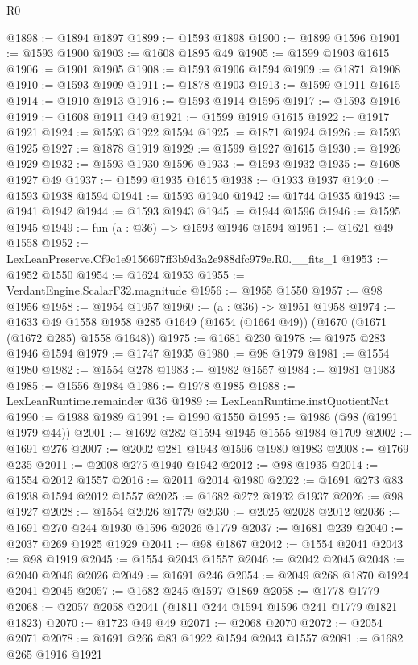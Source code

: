 \begin{lexlean}{R0}
\begin{coremodule}
@1898 := @1894 @1897
@1899 := @1593 @1898
@1900 := @1899 @1596
@1901 := @1593 @1900
@1903 := @1608 @1895 @49
@1905 := @1599 @1903 @1615
@1906 := @1901 @1905
@1908 := @1593 @1906 @1594
@1909 := @1871 @1908
@1910 := @1593 @1909
@1911 := @1878 @1903
@1913 := @1599 @1911 @1615
@1914 := @1910 @1913
@1916 := @1593 @1914 @1596
@1917 := @1593 @1916
@1919 := @1608 @1911 @49
@1921 := @1599 @1919 @1615
@1922 := @1917 @1921
@1924 := @1593 @1922 @1594
@1925 := @1871 @1924
@1926 := @1593 @1925
@1927 := @1878 @1919
@1929 := @1599 @1927 @1615
@1930 := @1926 @1929
@1932 := @1593 @1930 @1596
@1933 := @1593 @1932
@1935 := @1608 @1927 @49
@1937 := @1599 @1935 @1615
@1938 := @1933 @1937
@1940 := @1593 @1938 @1594
@1941 := @1593 @1940
@1942 := @1744 @1935
@1943 := @1941 @1942
@1944 := @1593 @1943
@1945 := @1944 @1596
@1946 := @1595 @1945
@1949 := fun (a : @36) => @1593 @1946 @1594
@1951 := @1621 @49 @1558
@1952 := LexLeanPreserve.Cf9c1e9156697ff3b9d3a2e988dfc979e.R0.__fits_1
@1953 := @1952 @1550
@1954 := @1624 @1953
@1955 := VerdantEngine.ScalarF32.magnitude
@1956 := @1955 @1550
@1957 := @98 @1956
@1958 := @1954 @1957
@1960 := (a : @36) -> @1951 @1958
@1974 := @1633
    @49
    @1558
    @1958
    @285
    @1649
    (@1654 (@1664 @49))
    (@1670 (@1671 (@1672 @285) @1558 @1648))
@1975 := @1681 @230
@1978 := @1975 @283 @1946 @1594
@1979 := @1747 @1935
@1980 := @98 @1979
@1981 := @1554 @1980
@1982 := @1554 @278
@1983 := @1982 @1557
@1984 := @1981 @1983
@1985 := @1556 @1984
@1986 := @1978 @1985
@1988 := LexLeanRuntime.remainder @36
@1989 := LexLeanRuntime.instQuotientNat
@1990 := @1988 @1989
@1991 := @1990 @1550
@1995 := @1986 (@98 (@1991 @1979 @44))
@2001 := @1692 @282 @1594 @1945 @1555 @1984 @1709
@2002 := @1691 @276
@2007 := @2002 @281 @1943 @1596 @1980 @1983
@2008 := @1769 @235
@2011 := @2008 @275 @1940 @1942
@2012 := @98 @1935
@2014 := @1554 @2012 @1557
@2016 := @2011 @2014 @1980
@2022 := @1691 @273 @83 @1938 @1594 @2012 @1557
@2025 := @1682 @272 @1932 @1937
@2026 := @98 @1927
@2028 := @1554 @2026 @1779
@2030 := @2025 @2028 @2012
@2036 := @1691 @270 @244 @1930 @1596 @2026 @1779
@2037 := @1681 @239
@2040 := @2037 @269 @1925 @1929
@2041 := @98 @1867
@2042 := @1554 @2041
@2043 := @98 @1919
@2045 := @1554 @2043 @1557
@2046 := @2042 @2045
@2048 := @2040 @2046 @2026
@2049 := @1691 @246
@2054 := @2049 @268 @1870 @1924 @2041 @2045
@2057 := @1682 @245 @1597 @1869
@2058 := @1778 @1779
@2068 := @2057 @2058 @2041 (@1811 @244 @1594 @1596 @241 @1779 @1821 @1823)
@2070 := @1723 @49 @49
@2071 := @2068 @2070
@2072 := @2054 @2071
@2078 := @1691 @266 @83 @1922 @1594 @2043 @1557
@2081 := @1682 @265 @1916 @1921

\end{coremodule}
\end{lexlean}
